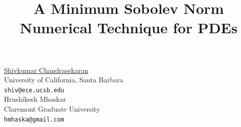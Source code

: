 \documentclass[article,A4,11pt]{llncs}%
\begin{document}
\title{A Minimum Sobolev Norm Numerical Technique for PDEs}
 \author{} \institute{}
\maketitle
\begin{center}
{\large \underline{Shivkumar Chandrasekaran}}\\
University of California, Santa Barbara\\
{\tt shiv@ece.ucsb.edu}
\\ \vspace{4mm}
{\large Hrushikesh Mhaskar}\\
Claremont Graduate University\\
{\tt hmhaska@gmail.com}
\end{center}
\end{document}
